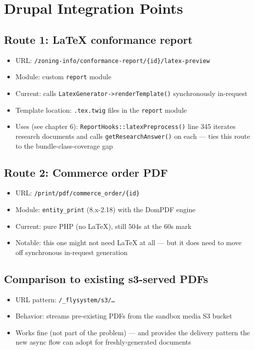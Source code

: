 \documentclass[11pt,letterpaper]{article}
\begin{document}
\newpage
\section{Drupal Integration Points}
\label{app:drupal}

\subsection{Route 1: LaTeX conformance report}
\begin{itemize}[nosep]
  \item URL: \texttt{/zoning-info/conformance-report/\{id\}/latex-preview}
  \item Module: custom \texttt{report} module
  \item Current: calls \texttt{LatexGenerator->renderTemplate()} synchronously in-request
  \item Template location: \texttt{.tex.twig} files in the \texttt{report} module
  \item Uses (see chapter 6): \texttt{ReportHooks::latexPreprocess()} line 345 iterates research documents and calls \texttt{getResearchAnswer()} on each --- ties this route to the bundle-class-coverage gap
\end{itemize}

\subsection{Route 2: Commerce order PDF}
\begin{itemize}[nosep]
  \item URL: \texttt{/print/pdf/commerce\_order/\{id\}}
  \item Module: \texttt{entity\_print} (8.x-2.18) with the DomPDF engine
  \item Current: pure PHP (no LaTeX), still 504s at the 60s mark
  \item Notable: this one might not need LaTeX at all --- but it does need to move off synchronous in-request generation
\end{itemize}

\subsection{Comparison to existing s3-served PDFs}
\begin{itemize}[nosep]
  \item URL pattern: \texttt{/\_flysystem/s3/\ldots}
  \item Behavior: streams pre-existing PDFs from the sandbox media S3 bucket
  \item Works fine (not part of the problem) --- and provides the delivery pattern the new async flow can adopt for freshly-generated documents
\end{itemize}
\end{document}

